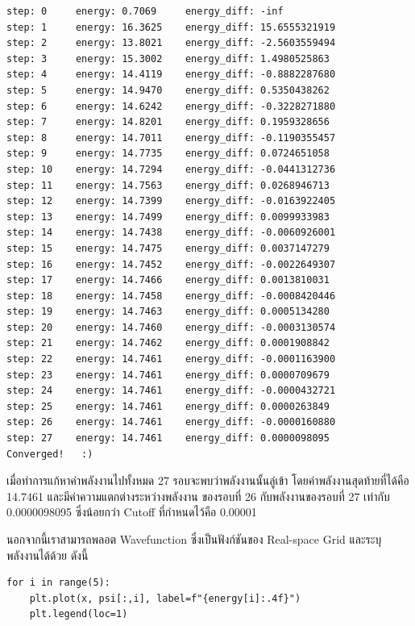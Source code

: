 \begin{lstlisting}[style=MyPython]
step: 0     energy: 0.7069     energy_diff: -inf
step: 1     energy: 16.3625    energy_diff: 15.6555321919
step: 2     energy: 13.8021    energy_diff: -2.5603559494
step: 3     energy: 15.3002    energy_diff: 1.4980525863
step: 4     energy: 14.4119    energy_diff: -0.8882287680
step: 5     energy: 14.9470    energy_diff: 0.5350438262
step: 6     energy: 14.6242    energy_diff: -0.3228271880
step: 7     energy: 14.8201    energy_diff: 0.1959328656
step: 8     energy: 14.7011    energy_diff: -0.1190355457
step: 9     energy: 14.7735    energy_diff: 0.0724651058
step: 10    energy: 14.7294    energy_diff: -0.0441312736
step: 11    energy: 14.7563    energy_diff: 0.0268946713
step: 12    energy: 14.7399    energy_diff: -0.0163922405
step: 13    energy: 14.7499    energy_diff: 0.0099933983
step: 14    energy: 14.7438    energy_diff: -0.0060926001
step: 15    energy: 14.7475    energy_diff: 0.0037147279
step: 16    energy: 14.7452    energy_diff: -0.0022649307
step: 17    energy: 14.7466    energy_diff: 0.0013810031
step: 18    energy: 14.7458    energy_diff: -0.0008420446
step: 19    energy: 14.7463    energy_diff: 0.0005134280
step: 20    energy: 14.7460    energy_diff: -0.0003130574
step: 21    energy: 14.7462    energy_diff: 0.0001908842
step: 22    energy: 14.7461    energy_diff: -0.0001163900
step: 23    energy: 14.7461    energy_diff: 0.0000709679
step: 24    energy: 14.7461    energy_diff: -0.0000432721
step: 25    energy: 14.7461    energy_diff: 0.0000263849
step: 26    energy: 14.7461    energy_diff: -0.0000160880
step: 27    energy: 14.7461    energy_diff: 0.0000098095
Converged!   :)
\end{lstlisting}

\vspace{1em}

เมื่อทำการแก้หาค่าพลังงานไปทั้งหมด 27 รอบจะพบว่าพลังงานนั้นลู่เข้า โดยค่าพลังงานสุดท้ายที่ได้คือ 14.7461 และมีค่าความแตกต่างระหว่างพลังงาน%
ของรอบที่ 26 กับพลังงานของรอบที่ 27 เท่ากับ 0.0000098095 ซึ่งน้อยกว่า Cutoff ที่กำหนดไว้คือ 0.00001

นอกจากนี้เราสามารถพลอต Wavefunction ซึ่งเป็นฟังก์ชันของ Real-space Grid และระบุพลังงานได้ด้วย ดังนี้

\begin{lstlisting}[style=MyPython]
for i in range(5):
    plt.plot(x, psi[:,i], label=f"{energy[i]:.4f}")
    plt.legend(loc=1)
\end{lstlisting}

\vspace{1em}

